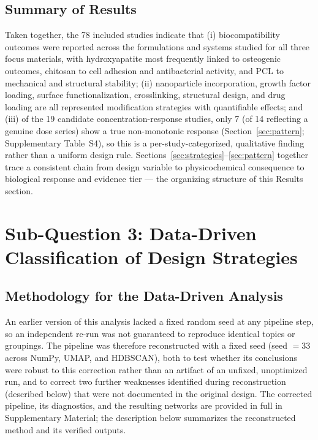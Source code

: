 \documentclass[5p,times,twocolumn]{elsarticle}
\begin{document}
\subsection{Summary of Results}

Taken together, the 78 included studies indicate that (i) biocompatibility outcomes were reported across the formulations and systems studied for all three focus materials, with hydroxyapatite most frequently linked to osteogenic outcomes, chitosan to cell adhesion and antibacterial activity, and PCL to mechanical and structural stability; (ii) nanoparticle incorporation, growth factor loading, surface functionalization, crosslinking, structural design, and drug loading are all represented modification strategies with quantifiable effects; and (iii) of the 19 candidate concentration-response studies, only 7 (of 14 reflecting a genuine dose series) show a true non-monotonic response (Section~\ref{sec:pattern}; Supplementary Table~S4), so this is a per-study-categorized, qualitative finding rather than a uniform design rule. Sections~\ref{sec:strategies}--\ref{sec:pattern} together trace a consistent chain from design variable to physicochemical consequence to biological response and evidence tier --- the organizing structure of this Results section.

\section{Sub-Question 3: Data-Driven Classification of Design Strategies}
\label{sec:q3}

\subsection{Methodology for the Data-Driven Analysis}

An earlier version of this analysis lacked a fixed random seed at any pipeline step, so an independent re-run was not guaranteed to reproduce identical topics or groupings. The pipeline was therefore reconstructed with a fixed seed (seed $=33$ across NumPy, UMAP, and HDBSCAN), both to test whether its conclusions were robust to this correction rather than an artifact of an unfixed, unoptimized run, and to correct two further weaknesses identified during reconstruction (described below) that were not documented in the original design. The corrected pipeline, its diagnostics, and the resulting networks are provided in full in Supplementary Material; the description below summarizes the reconstructed method and its verified outputs.
\end{document}
